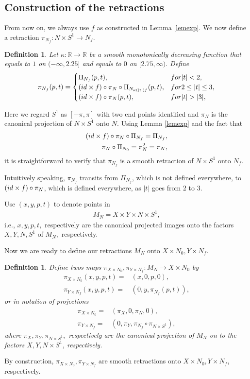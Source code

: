 \documentclass[11pt,a4paper]{amsart}
\numberwithin{equation}{section}
\newcommand{\ka}{\kappa}
\newcommand{\pxn}{\pi_{X\times N_0}}
\newcommand{\pyn}{\pi_{Y\times N_f}}
\newcommand{\R}{\mathbb{R}}
\newcommand{\id}{\textnormal{id}}
\theoremstyle{plain}
\newtheorem{defn}[exam]{Definition}
\theoremstyle{definition}
\numberwithin{equation}{subsection}
\begin{document}
\subsection{Construction of the retractions}\label{secconret}
From now on, we always use $f$ as constructed in Lemma \ref{lemexp}.
We now define a retraction $\pi_{N_f}:N\times S^1\to N_f$.
\begin{defn}\label{defnpnf}Let $\ka:\R\to\R$ be a smooth monotonically decreasing function that equals to $1$ on $(-\infty,2.25]$ and equals to $0$ on $[2.75,\infty).$
Define
\begin{align*}
\pi_{N_f}(p,t)=\begin{cases}
\Pi_{N_f}(p,t),&\textnormal{for }|t|< 2,\\
(\id\times f)\circ\pi_N\circ\Pi_{N_{\ka(|t|)f}}(p,t),&\textnormal{for }2\le|t|\le 3,\\
(\id\times f)\circ\pi_{N}(p,t),&\textnormal{for }|t|>|3|,
\end{cases}
\end{align*}
\end{defn}Here we regard $S^1$
as $[-\pi,\pi]$ with two end points identified and $\pi_N$ is the canonical projection of $N\times S^1$ onto $N$. Using Lemma \ref{lemexp} and the fact that 
\begin{align*}
	(\id\times f)\circ\pi_N\circ \Pi_{N_f}=\Pi_{N_f},\\
	\pi_N\circ\Pi_{N_0}=\pi_N^2=\pi_N,
\end{align*} it is straightforward to verify that $\pi_{N_f}$ is a smooth retraction of $N\times S^1$ onto $N_f.$

Intuitively speaking, $\pi_{N_f}$ transits from $\Pi_{N_f}$, which is not defined everywhere, to $(\id\times f)\circ\pi_N$, which is defined everywhere, as $|t|$ goes from $2$ to $3$.

Use $(x,y,p,t)$ to denote points in 
\begin{align*}
M_N=X\times Y\times N\times S^1,
\end{align*}
i.e., $x,y,p,t,$ respectively are the canonical projected images onto the factors $X,Y,N,S^1$ of $M_N,$ respectively. 

Now we are ready to define our retractions  $M_N$ onto $X\times N_0,Y\times N_f.$
\begin{defn}\label{defnp}
Define twos maps $\pxn,\pyn:M_N\to X\times N_0$ by
\begin{align*}
\pxn(x,y,p,t)=&(x,0,p,0),\\
\pyn(x,y,p,t)=&(0,y,\pi_{N_f}(p,t)),
\end{align*}
or in notation of projections
\begin{align*}
\pxn=&(\pi_X,0,\pi_N,0),\\
\pyn=&(0,\pi_Y,\pi_{N_f}\circ\pi_{N\times S^1}),
\end{align*}
where $\pi_X,\pi_Y,\pi_{N\times S^1},$ respectively are the canonical projection of $M_N$ on to the factors $X,Y,N\times S^1$, respectively.
\end{defn}
By construction, $\pxn,\pyn$ are smooth retractions onto $X\times N_0,Y\times N_f$, respectively.
\end{document}
